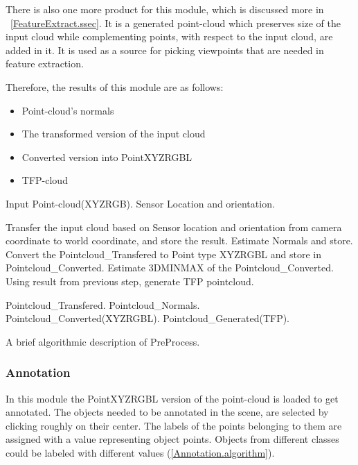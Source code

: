 There is also one more product for this module, which is discussed more in ~\ref{FeatureExtract.ssec}.
 It is a generated point-cloud which preserves size of the input cloud while complementing points, with respect to the input cloud,
 are added in it. It is used as a source for picking viewpoints that are needed in feature extraction.
 
 Therefore, the results of this module are as follows:
 \begin{itemize}
  \item Point-cloud's normals
  \item The transformed version of the input cloud
  \item Converted version into PointXYZRGBL
  \item TFP-cloud
 \end{itemize}
 
\begin{algorithm}[t]
\begin{algorithmic}[1]
\REQUIRE Input Point-cloud(XYZRGB).
\REQUIRE Sensor Location and orientation.
\medskip

\STATE Transfer the input cloud based on Sensor location and orientation from camera coordinate to world coordinate, and store the 
result.
\STATE Estimate Normals and store.
\STATE Convert the Pointcloud\_Transfered to Point type XYZRGBL and store in Pointcloud\_Converted.
\STATE Estimate 3DMINMAX of the Pointcloud\_Converted.
\STATE Using result from previous step, generate TFP pointcloud.

\medskip
\ENSURE Pointcloud\_Transfered.
\ENSURE Pointcloud\_Normals.
\ENSURE Pointcloud\_Converted(XYZRGBL).
\ENSURE Pointcloud\_Generated(TFP).

\end{algorithmic}
\caption[PreProcess.]
{A brief algorithmic description of PreProcess.}
\label{Preprocess.algorithm}
\end{algorithm}



 
 
\subsubsection{Annotation}
\label{Annotation.ssec}
In this module the PointXYZRGBL version of the point-cloud is loaded to get annotated. 
The objects needed to be annotated in the scene, are selected by clicking roughly on their center. 
The labels of the points belonging to them are assigned with a value representing object points. 
Objects from different classes could be labeled with different values (\ref{Annotation.algorithm}).

